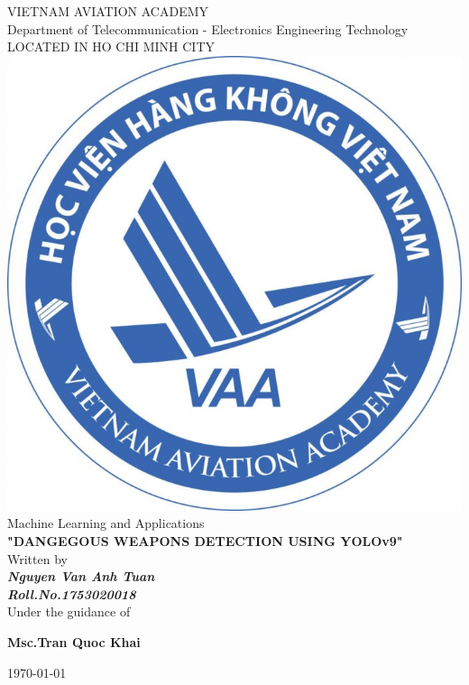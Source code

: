 \documentclass[a4paper,13pt]{report}
\begin{document}
    \newpage
    \thispagestyle{plain}
        \centering
        
        \LARGE{\textsc{VIETNAM AVIATION ACADEMY}}\\
        \vspace{3mm}
        \normalsize{Department of Telecommunication - Electronics Engineering Technology} \\
        \vspace{3mm}
        \large{LOCATED IN HO CHI MINH CITY} \\
        \vspace{3mm}
        \includegraphics[scale=0.3]{img/logo.png} \\
        \vspace{3mm}
        \Large{Machine Learning and Applications} \\
        \vspace{10mm}
        \LARGE{\textbf{"DANGEGOUS WEAPONS DETECTION USING YOLOv9"}} \\ 
        \vspace{20mm}
        \normalsize{Written by} \\ 
        \vspace{3mm}
        \large{\textbf{\textit{Nguyen Van Anh Tuan}}} \\ 
        \vspace{3mm}
        \large{\textbf{\textit{Roll.No.1753020018}}} \\ 
        \vspace{15mm}
        \large{Under the guidance of} \\
        \vspace{7mm}
        \centerline{\textbf{\large{Msc.Tran Quoc Khai}}}
        \vspace{3.5cm}
        \centerline{\today}
    
\end{document}
